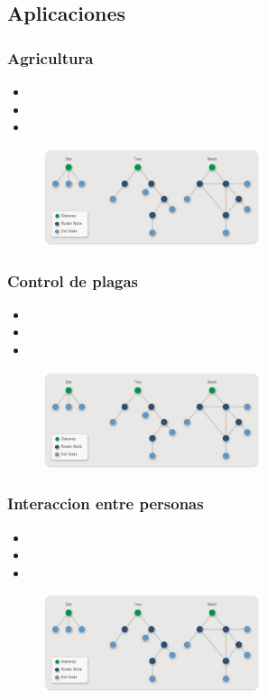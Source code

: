 \documentclass{beamer}
\begin{document}
\subsection{Aplicaciones}

\begin{frame}
\frametitle{Agricultura}
\begin{itemize}
\item 
\item 
\item 
\end{itemize}
\begin{figure}[!h]
\centering
\includegraphics[width=2.5in]{topologias}
\end{figure}
\end{frame}

\begin{frame}
\frametitle{Control de plagas}
\begin{itemize}
\item 
\item 
\item 
\end{itemize}
\begin{figure}[!h]
\centering
\includegraphics[width=2.5in]{topologias}
\end{figure}
\end{frame}

\begin{frame}
\frametitle{Interaccion entre personas}
\begin{itemize}
\item 
\item 
\item 
\end{itemize}
\begin{figure}[!h]
\centering
\includegraphics[width=2.5in]{topologias}
\end{figure}
\end{frame}
\end{document}

